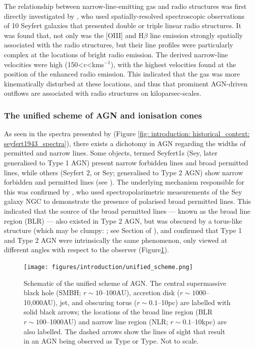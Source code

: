 The relationship between narrow-line-emitting gas and radio structures was first directly investigated by \citet{Whittle1988}, who used spatially-resolved spectroscopic observations of 10 Seyfert galaxies that presented double or triple linear radio structures. It was found that, not only was the [OIII] and H$\beta$ line emission strongly spatially associated with the radio structures, but their line profiles were particularly complex at the locations of bright radio emission. The derived narrow-line velocities were high (150\;\textless\;$v$\;\textless{}\;km\;s$^{-1}$), with the highest velocities found at the position of the enhanced radio emission. This indicated that the gas was more kinematically disturbed at these locations, and thus that prominent AGN-driven outflows are associated with radio structures on kiloparsec-scales.

\subsubsection{The unified scheme of AGN and ionisation cones}
\label{section: introduction: historical_context: nlr_studies: unified scheme}

As seen in the spectra presented by \citet{Seyfert1943} (Figure \ref{fig: introduction: historical_context: seyfert1943_spectra}), there exists a dichotomy in AGN regarding the widths of permitted and narrow lines. Some objects, termed Seyfert\;1s (Sey, later generalised to Type 1 AGN) present narrow forbidden lines and broad permitted lines, while others (Seyfert 2, or Sey; generalised to Type 2 AGN) show narrow forbidden and permitted lines (see \citealt{Khachikian1971}). The underlying mechanism responsible for this was confirmed by \citet{Antonucci1985}, who used spectropolarimetric measurements of the Sey galaxy NGC to demonstrate the presence of polarised broad permitted lines. This indicated that the source of the broad permitted lines --- known as the broad line region (BLR) --- also existed in Type 2 AGN, but was obscured by a torus-like structure (which may be clumpy: \citealt{Nenkova2002, Nenkova2008}; see Section of \citealt{Netzer2015}), and confirmed that Type 1 and Type 2 AGN were intrinsically the same phenomenon, only viewed at different angles with respect to the observer (Figure\;\ref{fig: introduction: historical_context: nlr_studies: unified_scheme}).

\begin{figure}[!ht]
    \centering
    \texttt{[image: figures/introduction/unified\_scheme.png]}
    \caption[Schematic of the unified scheme of AGN.]{Schematic of the unified scheme of AGN. The central supermassive black hole (SMBH; $r\sim10$--100\;AU), accretion disk ($r\sim1000$--10,000\;AU), jet, and obscuring torus ($r\sim0.1$--10\;pc) are labelled with solid black arrows; the locations of the broad line region (BLR $r\sim100$--1000\;AU) and narrow line region (NLR; $r\sim0.1$--10\;kpc) are also labelled. The dashed arrows show the lines of sight that result in an AGN being observed as Type or Type. Not to scale.}
    \label{fig: introduction: historical_context: nlr_studies: unified_scheme}
\end{figure}

